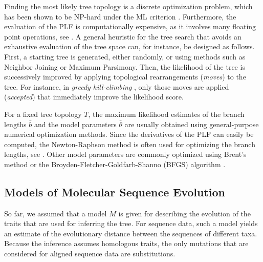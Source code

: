 Finding the most likely tree topology is a discrete optimization problem,
which has been shown to be NP-hard under the ML criterion \cite{Chor2005}.
Furthermore, the evaluation of the PLF is computationally expensive,
as it involves many floating point operations, see .
A general heuristic for the tree search that avoids an exhaustive evaluation of the tree space can,
for instance, be designed as follows.
First, a starting tree is generated, either randomly, or using methods such as Neighbor Joining or Maximum Parsimony.
Then, the likelihood of the tree is successively improved
by applying topological rearrangements (\emph{moves}) to the tree.
For instance, in \emph{greedy hill-climbing} \cite{Stamatakis2014}, only those moves are applied (\emph{accepted})
that immediately improve the likelihood score.

For a fixed tree topology $T$, the maximum likelihood estimates
of the branch lengths $\bar{b}$ and the model parameters $\bar{\theta}$
are usually obtained using general-purpose numerical optimization methods.
Since the derivatives of the PLF can easily be computed,
the Newton-Raphson method \cite{Ypma1995} is often used for optimizing the branch lengths,
see .
Other model parameters are commonly optimized using Brent's method \cite{Brent1971}
or the Broyden-Fletcher-Goldfarb-Shanno (BFGS) algorithm \cite{Fletcher1987}.


\subsection{Models of Molecular Sequence Evolution}
\label{ch:Foundations:sec:MLTreeInference:sub:ModelsOfSeqEvol}

So far, we assumed that a model $M$ is given for describing the evolution of the traits that are used for inferring the tree.
For sequence data, such a model yields an estimate of the evolutionary distance between the sequences of different taxa.
Because the inference assumes homologous traits,
the only mutations that are considered for aligned sequence data are substitutions.

